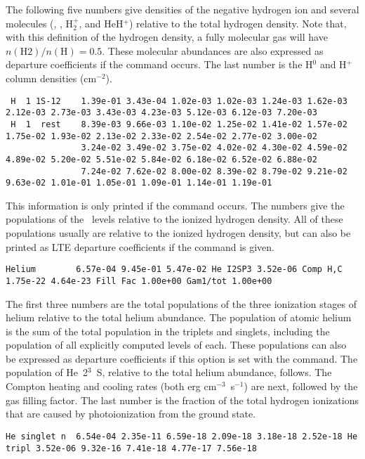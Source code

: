 The following five numbers give densities of the negative hydrogen ion
and several molecules (\hminus, \htwo, H$_2^+$, and HeH$^+$)
relative to the total hydrogen density.
Note that, with this definition of the hydrogen density, a fully
molecular gas will have $n(\mathrm{H}2)/n(\mathrm{H})=0.5$.
These molecular abundances are
also expressed as departure coefficients if the
command occurs.
The last number is the H$^0$ and H$^+$ column densities
(cm$^{-2}$).
{\setverbatimfontsize{\tiny}
\begin{verbatim}
 H  1 1S-12    1.39e-01 3.43e-04 1.02e-03 1.02e-03 1.24e-03 1.62e-03 2.12e-03 2.73e-03 3.43e-03 4.23e-03 5.12e-03 6.12e-03 7.20e-03
 H  1  rest    8.39e-03 9.66e-03 1.10e-02 1.25e-02 1.41e-02 1.57e-02 1.75e-02 1.93e-02 2.13e-02 2.33e-02 2.54e-02 2.77e-02 3.00e-02
               3.24e-02 3.49e-02 3.75e-02 4.02e-02 4.30e-02 4.59e-02 4.89e-02 5.20e-02 5.51e-02 5.84e-02 6.18e-02 6.52e-02 6.88e-02
               7.24e-02 7.62e-02 8.00e-02 8.39e-02 8.79e-02 9.21e-02 9.63e-02 1.01e-01 1.05e-01 1.09e-01 1.14e-01 1.19e-01
\end{verbatim}
}
This information is only printed if the
 command occurs.
The numbers give the populations of the \hO\ levels relative to the
ionized hydrogen density.
All of these populations usually are relative
to the ionized hydrogen density, but can also be printed as LTE departure
coefficients if the  command
is given.
{\setverbatimfontsize{\tiny}
\begin{verbatim}
Helium        6.57e-04 9.45e-01 5.47e-02 He I2SP3 3.52e-06 Comp H,C 1.75e-22 4.64e-23 Fill Fac 1.00e+00 Gam1/tot 1.00e+00
\end{verbatim}
}

The first three numbers are the total populations of the three ionization
stages of helium relative to the total helium abundance.
The population
of atomic helium is the sum of the total population in the triplets and
singlets, including the population of all explicitly computed levels of
each.
These populations can also be expressed as departure coefficients
if this option is set with the  command.
The
population of He~2$^3$~S, relative to the total helium abundance, follows.
The Compton heating and cooling rates (both erg cm$^{-3}$~s$^{-1}$) are next, followed
by the gas filling factor.
The last number is the fraction of the total
hydrogen ionizations that are caused by photoionization from the ground
state.
{\setverbatimfontsize{\tiny}
\begin{verbatim}
He singlet n  6.54e-04 2.35e-11 6.59e-18 2.09e-18 3.18e-18 2.52e-18 He tripl 3.52e-06 9.32e-16 7.41e-18 4.77e-17 7.56e-18
\end{verbatim}
}

